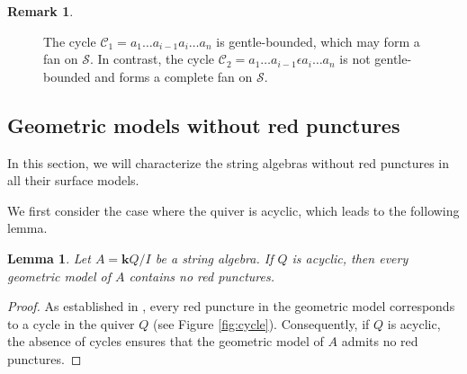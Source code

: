 \documentclass[11pt]{amsart}
\numberwithin{equation}{section}
\newtheorem{lemma}[theorem]{Lemma}
\theoremstyle{definition}
\newtheorem{remark}[theorem]{Remark}
\begin{document}
\begin{remark}
\begin{figure}[htbp]
\begin{center}
	\end{center}
	\caption{ The cycle $\mathcal{C}_1 = a_1 \dots a_{i-1} a_i \dots a_n$ is gentle-bounded, which may form a fan on $\mathcal{S}$. In contrast, the cycle $\mathcal{C}_2 = a_1 \dots a_{i-1} \epsilon a_i \dots a_n$ is not gentle-bounded and forms a complete fan on $\mathcal{S}$.} \label{fig:cycle-complete fan}
\end{figure}



\end{remark}




\subsection{Geometric models without red punctures}
 
 In this section, we will characterize the string algebras without red punctures in all their surface models. 
 
 We first consider the case where the quiver is acyclic, which leads to the following lemma.


 \begin{lemma}\label{lem:acyclic}
 	Let $A = \mathbf{k}Q/I$ be a string algebra. If $Q$ is acyclic, then every geometric model of \( A \) contains no red punctures. 
 \end{lemma}
\begin{proof}
As established in \cite{PPP19}, every red puncture in the geometric model corresponds to a cycle in the quiver $Q$ (see Figure \ref{fig:cycle}). Consequently, if $Q$ is acyclic, the absence of cycles ensures that the geometric model of $A$ admits no red punctures.
\end{proof}
\end{document}
